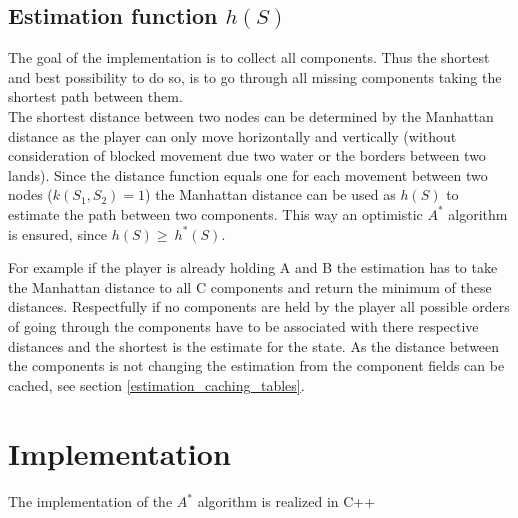 \documentclass{article}
\begin{document}
\subsection{Estimation function $h(S)$}
The goal of the implementation is to collect all components. Thus the shortest and best possibility to do so, is to go through all missing components taking the shortest path between them. \\
The shortest distance between two nodes can be determined by the Manhattan distance as the player can only move horizontally and vertically (without consideration of blocked movement due two water or the borders between two lands). Since the distance function equals one for each movement between two nodes ($k(S_1, S_2) = 1$) the Manhattan distance can be used as $h(S)$ to estimate the path between two components.
This way an optimistic $A^*$ algorithm is ensured, since $h(S) \geq \ h^*(S)$.

 For example if the player is already holding A and B the estimation has to take the Manhattan distance to all C components and return the minimum of these distances. Respectfully if no components are held by the player all possible orders of going through the components have to be associated with there respective distances and the shortest is the estimate for the state. As the distance between the components is not changing the estimation from the component fields can be cached, see section \ref{estimation_caching_tables}. %


\section{Implementation}
The implementation of the $A^*$ algorithm is realized in C++
\end{document}
